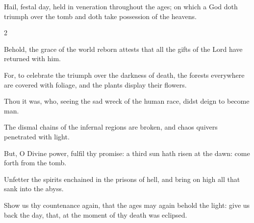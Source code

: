 \begin{enpars}
 \noindent Hail, festal day, held in veneration
throughout the ages; on which a
God doth triumph over the tomb and
doth take possession of the heavens.
\end{enpars}

\begin{multicols}{2}
\raggedcolumns
\begin{enpars}
Behold, the grace of the world
reborn attests that all the gifts
of the Lord have returned
with him.

For, to celebrate the triumph over
the darkness of death, the forests
everywhere are covered with foliage,
and the plants display their flowers.

Thou it was, who, seeing
the sad wreck of the human
race, didst deign to become
man.

The dismal chains of the
infernal regions are broken,
and chaos quivers penetrated
with light.

But, O Divine power,
fulfil thy promise: a third
sun hath risen at the dawn:
come forth from the tomb.

Unfetter the spirits
enchained in the prisons
of hell, and bring on high
all that sank into the abyss.

Show us thy countenance again,
that the ages may again behold the
light: give us back the day, that, at the
moment of thy death was eclipsed.
\end{enpars}
\end{multicols}